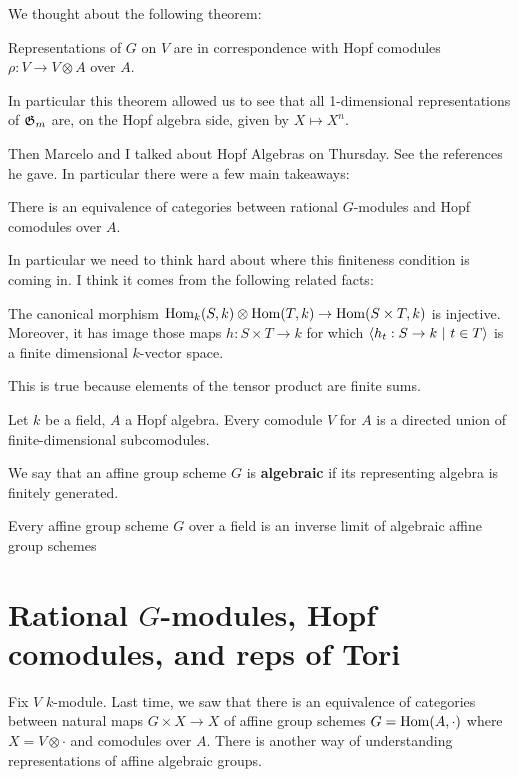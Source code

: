 \documentclass[12pt]{article}
\begin{document}
\hfill 

We thought about the following theorem: \begin{theorem}
    Representations of $G$ on $V$ are in correspondence with Hopf comodules $\rho:V\to V\otimes A$ over $A$.
\end{theorem} In particular this theorem allowed us to see that all 1-dimensional representations of $\mathfrak{G}_m$ are, on the Hopf algebra side, given by $X\mapsto X^n$.

\hfill 

Then Marcelo and I talked about Hopf Algebras on Thursday. See the references he gave. In particular there were a few main takeaways:\begin{fact}
    There is an equivalence of categories between rational $G$-modules and Hopf comodules over $A$.
\end{fact} In particular we need to think hard about where this finiteness condition is coming in. I think it comes from the following related facts:\begin{fact}
    The canonical morphism $\operatorname{Hom}_k(S,k)\otimes\operatorname{Hom}(T,k)\to \operatorname{Hom}(S\times T,k)$ is injective. Moreover, it has image those maps $h:S\times T\to k$ for which $\langle h_t:S\to k \ \vert \  t\in T
    \rangle$ is a finite dimensional $k$-vector space.
\end{fact} This is true because elements of the tensor product are finite sums.
\begin{fact}
Let $k$ be a field, $A$ a Hopf algebra. Every comodule $V$ for $A$ is a directed union of finite-dimensional subcomodules.
\end{fact}
We say that an affine group scheme $G$ is \textbf{algebraic} if its representing algebra is finitely generated.
\begin{corollary}
    Every affine group scheme $G$ over a field is an inverse limit of algebraic affine group schemes
\end{corollary}

\section{Rational $G$-modules, Hopf comodules, and reps of Tori} Fix $V$ $k$-module. Last time, we saw that there is an equivalence of categories between natural maps $G\times X\to X$ of affine group schemes $G = \operatorname{Hom}(A,\cdot)$ where $X = V \otimes \cdot$ and comodules over $A$. There is another way of understanding representations of affine algebraic groups. 
\end{document}
